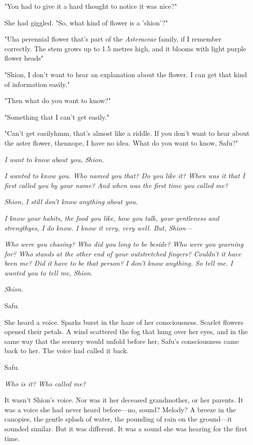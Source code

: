 "You had to give it a hard thought to notice it was nice?"

She had giggled. "So, what kind of flower is a 'shion'?"

"Uh\el a perennial flower that's part of the \emph{Asteraceae} family, if I
remember correctly. The stem grows up to 1.5 metres high, and it blooms
with light purple flower heads\el "

"Shion, I don't want to hear an explanation about the flower. I can get
that kind of information easily."

"Then what do you want to know?"

"Something that I can't get easily."

"Can't get easily\el hmm, that's almost like a riddle. If you don't want
to hear about the aster flower, then\el nope, I have no idea. What do
you want to know, Safu?"

\emph{I want to know about you, Shion.}

\emph{I wanted to know you. Who named you that? Do you like it? When was
it that I first called you by your name? And when was the first time you
called me\el ?}

\emph{Shion, I still don't know anything about you.}

\emph{I know your habits, the food you like, how you talk, your
gentleness and strength\el yes, I do know. I know it very, very well.
But, Shion---}

\emph{Who were you chasing? Who did you long to be beside? Who were you
yearning for? Who stands at the other end of your outstretched fingers?
Couldn't it have been me? Did it have to be that person? I don't know
anything. So tell me. I wanted you to tell me, Shion.}

\emph{Shion.}

\myspace

Safu.

She heard a voice. Sparks burst in the haze of her consciousness.
Scarlet flowers opened their petals. A wind scattered the fog that hung
over her eyes, and in the same way that the scenery would unfold before
her, Safu's consciousness came back to her. The voice had called it
back.

Safu.

\emph{Who is it? Who called me?}

It wasn't Shion's voice. Nor was it her deceased grandmother, or her
parents. It was a voice she had never heard before---no, sound? Melody? A
breeze in the canopies, the gentle splash of water, the pounding of rain
on the ground---it sounded similar. But it was different. It was a sound
she was hearing for the first time.

